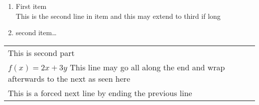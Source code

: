 \documentclass{article}
\begin{document}
\begin{minipage}{0.45\textwidth}
\begin{enumerate}
  \item First item \\
        This is the second line in item and this may extend to third if long
  \item second item\ldots
\end{enumerate}
\end{minipage}%
\hfill
\begin{minipage}{0.45\textwidth}
\begin{tabular}{|p{\textwidth}}
This is second part \\
$f(x) = 2x + 3y$ This line may go all along the end and wrap afterwards to the next as seen here\\
This is a forced next line by ending the previous line 
\end{tabular}
\end{minipage}%
\end{document}
